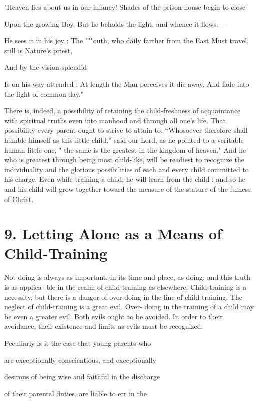 \documentclass[
]{book}
\begin{document}
"Heaven lies about us in our infancy! Shades of the prison-house begin to close

Upon the growing Boy, But he beholds the light, and whence it flows. ---

He sees it in his joy ; The """outh, who daily farther from the East Must travel, still is Nature's priest,

And by the vision splendid

Is on his way attended ; At length the Man perceives it die away, And fade into the light of common day."

There is, indeed, a possibility of retaining the child-freshness of acquaintance with spiritual truths even into manhood and through all one's life. That possibility every parent ought to strive to attain to. ``Whosoever therefore shall humble himself as this little child,'' said our Lord, as he pointed to a veritable human little one, " the same is the greatest in the kingdom of heaven." And he who is greatest through being most child-like, will be readiest to recognize the individuality and the glorious possibilities of each and every child committed to his charge. Even while training a child, he will learn from the child ; and so he and his child will grow together toward the measure of the stature of the fulness of Christ.

\hypertarget{letting-alone-as-a-means-of-child-training}{%
\chapter{9. Letting Alone as a Means of Child-Training}\label{letting-alone-as-a-means-of-child-training}}

Not doing is always as important, in its time and place, as doing; and this truth is as applica- ble in the realm of child-training as elsewhere. Child-training is a necessity, but there is a danger of over-doing in the line of child-training. The neglect of child-training is a great evil. Over- doing in the training of a child may be even a greater evil. Both evils ought to be avoided. In order to their avoidance, their existence and limits as evils must be recognized.

Peculiarly is it the case that young parents who

are exceptionally conscientious, and exceptionally

desirous of being wise and faithful in the discharge

of their parental duties, are liable to err in the
\end{document}
